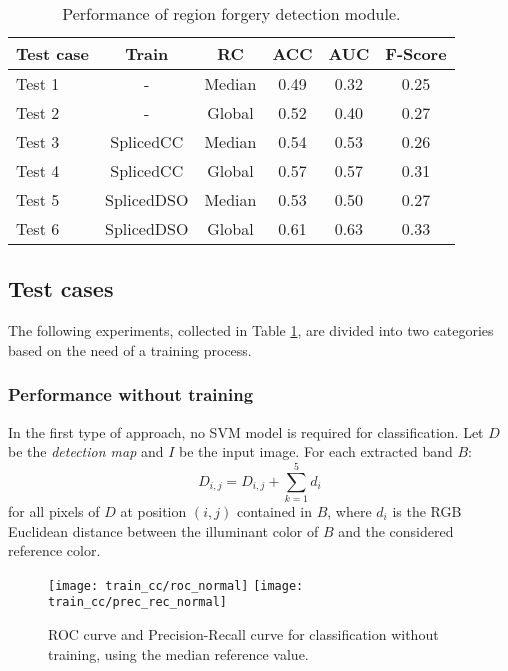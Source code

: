 \begin{table}[h!]
\centering
\begin{tabular}{l c c c c c} 
\hline \hline 
\textbf{Test case} & \textbf{Train} & \textbf{RC} & \textbf{ACC} & \textbf{AUC} &\textbf{ F-Score} \\ [0.5ex]
\hline
Test 1 & - & Median & 0.49 & 0.32 & 0.25\\
Test 2 & - & Global & 0.52 & 0.40 & 0.27\\
Test 3 & SplicedCC & Median & 0.54 & 0.53 & 0.26\\
Test 4 & SplicedCC & Global & 0.57 & 0.57 & 0.31\\
Test 5 &	 SplicedDSO & Median & 0.53 & 0.50 & 0.27\\
Test 6 &	 SplicedDSO & Global & 0.61 & 0.63 & 0.33\\ [1ex]
\hline
\end{tabular}
\caption{Performance of region forgery detection module.}
\label{table:performanceregionaldet}
\end{table}

\subsection{Test cases}

The following experiments, collected in Table \ref{table:performanceregionaldet}, are divided into two categories based on the need of a training process.

\subsubsection{Performance without training}

In the first type of approach, no SVM model is required for classification. Let $D$ be the \emph{detection map} and $I$ be the input image. For each extracted band $B$:
$$
D_{i, j} = D_{i, j} + \sum_{k = 1}^{5} d_i
$$
for all pixels of $D$ at position $(i, j)$ contained in $B$, where $d_i$ is the RGB Euclidean distance between the illuminant color of $B$ and the considered reference color.

\begin{figure}[!htb]
  \texttt{[image: train\_cc/roc\_normal]}
\endminipage\hfill
{}
  \texttt{[image: train\_cc/prec\_rec\_normal]}
\endminipage
\caption{ROC curve and Precision-Recall curve for classification without training, using the median reference value.}\label{fig:regiondetnormal}
\end{figure}

